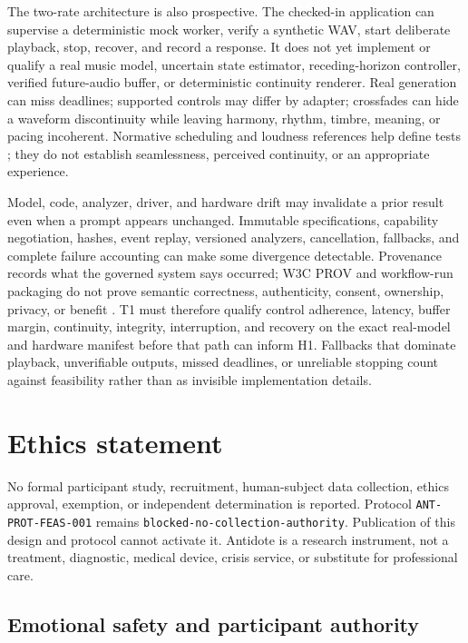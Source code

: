The two-rate architecture is also prospective. The checked-in application can
supervise a deterministic mock worker, verify a synthetic WAV, start deliberate
playback, stop, recover, and record a response. It does not yet implement or
qualify a real music model, uncertain state estimator, receding-horizon
controller, verified future-audio buffer, or deterministic continuity renderer.
Real generation can miss deadlines; supported controls may differ by adapter;
crossfades can hide a waveform discontinuity while leaving harmony, rhythm,
timbre, meaning, or pacing incoherent. Normative scheduling and loudness
references help define tests \citep{w3c2024webaudio,ebu2023r128}; they do not
establish seamlessness, perceived continuity, or an appropriate experience.

Model, code, analyzer, driver, and hardware drift may invalidate a prior result
even when a prompt appears unchanged. Immutable specifications, capability
negotiation, hashes, event replay, versioned analyzers, cancellation, fallbacks,
and complete failure accounting can make some divergence detectable. Provenance
records what the governed system says occurred; W3C PROV and workflow-run
packaging do not prove semantic correctness, authenticity, consent, ownership,
privacy, or benefit \citep{moreau2013prov,leo2024rocrate}. T1 must therefore
qualify control adherence, latency, buffer margin, continuity, integrity,
interruption, and recovery on the exact real-model and hardware manifest before
that path can inform H1. Fallbacks that dominate playback, unverifiable outputs,
missed deadlines, or unreliable stopping count against feasibility rather than
as invisible implementation details.


\section{Ethics statement}
\label{sec:ethics-statement}

No formal participant study, recruitment, human-subject data collection, ethics
approval, exemption, or independent determination is reported. Protocol
\texttt{ANT-PROT-FEAS-001} remains
\texttt{blocked-no-collection-authority}. Publication of this design and
protocol cannot activate it. Antidote is a research instrument, not a treatment,
diagnostic, medical device, crisis service, or substitute for professional care.

\subsection{Emotional safety and participant authority}
\label{sec:ethics-emotional-safety}

